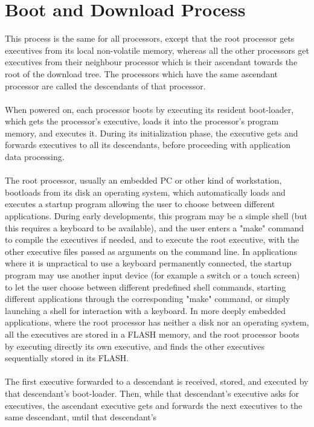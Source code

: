 \documentclass[11pt,twoside]{report}
\begin{document}
\section{Boot and Download Process}
This process is the same for all processors, except that the root
processor gets executives from its local non-volatile memory, whereas
all the other processors get executives from their neighbour processor
which is their ascendant towards the root of the download tree. The
processors which have the same ascendant processor are called the
descendants of that processor.\\\\
When powered on, each processor boots by executing its resident
boot-loader, which gets the processor's executive, loads it into the
processor's program memory, and executes it. During its initialization
phase, the executive gets and forwards executives to all its
descendants, before proceeding with application data processing.\\\\
The root processor, usually an embedded PC or other kind of workstation,
bootloads from its disk an operating system, which automatically loads
and executes a startup program allowing the user to choose between
different applications. During early developments, this program may be a
simple shell (but this requires a keyboard to be available), and the
user enters a "make" command to compile the executives if needed, and to
execute the root executive, with the other executive files passed as
arguments on the command line. In applications where it is unpractical
to use a keyboard permanently connected, the startup program may use
another input device (for example a switch or a touch screen) to let the
user choose between different predefined shell commands, starting
different applications through the corresponding "make" command, or
simply launching a shell for interaction with a keyboard. In more deeply
embedded applications, where the root processor has neither a disk nor
an operating system, all the executives are stored in a FLASH memory,
and the root processor boots by executing directly its own executive,
and finds the other executives sequentially stored in its FLASH.\\\\
The first executive forwarded to a descendant is received, stored, and
executed by that descendant's boot-loader. Then, while that descendant's
executive asks for executives, the ascendant executive gets and forwards
the next executives to the same descendant, until that descendant's
\end{document}
